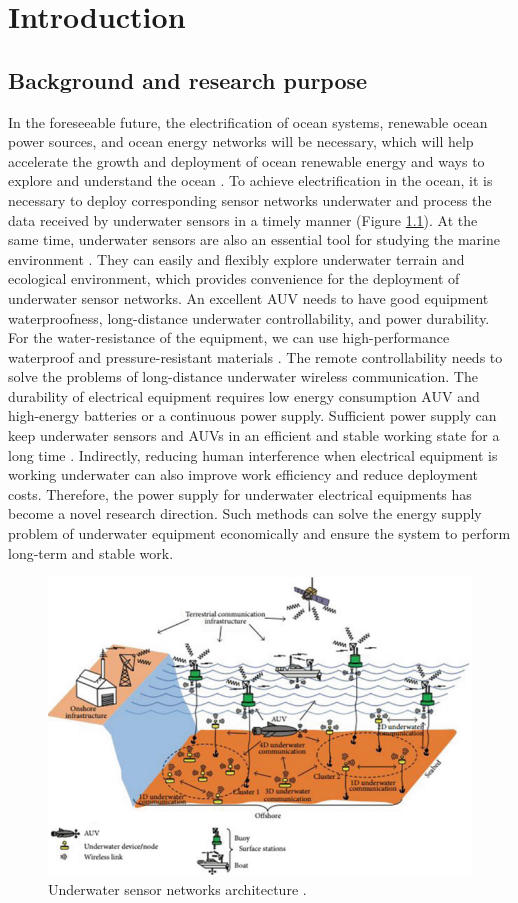 \chapter{Introduction}
\section{Background and research purpose}
In the foreseeable future, the electrification of ocean systems, renewable ocean power sources, and ocean energy networks will be necessary, which will help accelerate the growth and deployment of ocean renewable energy and ways to explore and understand the ocean \cite{Orekan, Randhawa2015}. To achieve electrification in the ocean, it is necessary to deploy corresponding sensor networks underwater and process the data received by underwater sensors in a timely manner (Figure \ref{fig:underwater sensor networks}). At the same time, underwater sensors are also an essential tool for studying the marine environment \cite{Heidemann2012, Wu2020}. They can easily and flexibly explore underwater terrain and ecological environment, which provides convenience for the deployment of underwater sensor networks. An excellent AUV needs to have good equipment waterproofness, long-distance underwater controllability, and power durability. For the water-resistance of the equipment, we can use high-performance waterproof and pressure-resistant materials \cite{Hwang2019, Tran2020, Bradley2001}. The remote controllability needs to solve the problems of long-distance underwater wireless communication. The durability of electrical equipment requires low energy consumption AUV and high-energy batteries or a continuous power supply. Sufficient power supply can keep underwater sensors and AUVs in an efficient and stable working state for a long time \cite{Jurdak2006}. Indirectly, reducing human interference when electrical equipment is working underwater can also improve work efficiency and reduce deployment costs. Therefore, the power supply for underwater electrical equipments has become a novel research direction. Such methods can solve the energy supply problem of underwater equipment economically and ensure the system to perform long-term and stable work.

\begin{figure}[htbp]
    \centering
    \includegraphics[width=0.7\linewidth]{images/1_underwater_sensor_networks.png}
    \caption{Underwater sensor networks architecture \cite{Nayyar}.}
    \label{fig:underwater sensor networks}
\end{figure}

